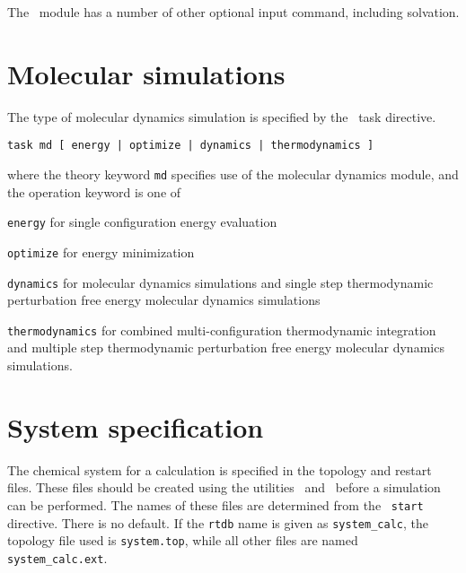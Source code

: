 The \prepare\ module has a number of other optional input command,
including solvation.

\section{Molecular simulations}
The type of molecular dynamics simulation is specified by the
\nwchem\ task directive.
\begin{verbatim}
task md [ energy | optimize | dynamics | thermodynamics ]
\end{verbatim}
where the theory keyword {\tt md} specifies use of the molecular
dynamics module, and the operation keyword is one of
\begin{description}
\item
{\tt energy} for single configuration energy evaluation
\item
{\tt optimize} for energy minimization
\item
{\tt dynamics} for molecular dynamics simulations and single step
thermodynamic perturbation free energy molecular dynamics simulations
\item
{\tt thermodynamics} for combined multi-configuration thermodynamic
integration and multiple step thermodynamic perturbation free
energy molecular dynamics simulations.
\end{description}

\section{System specification}
The chemical system for a calculation is specified in the topology
and restart files. These files should be created using the utilities
\nwtop\ and \nwrst\ before a simulation can be performed.
The names of these files are determined from the \nwchem\ \verb+start+ 
directive.
There is no default. If the \verb+rtdb+ name is given as {\tt system\_calc},
the topology file used is {\tt system.top}, while all other files
are named {\tt system\_calc.ext}.

